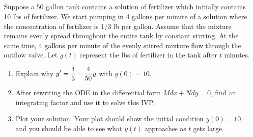 %


\subsection*{\ideaB}

\begin{problem}
Suppose a 50 gallon tank contains a solution of fertilizer which initially contains 10 lbs of fertilizer. We start pumping in 4 gallons per minute of a solution where the concentration of fertilizer is 1/3 lb per gallon. 
Assume that the mixture remains evenly spread throughout the entire tank by constant stirring. 
At the same time, 4 gallons per minute of the evenly stirred mixture flow through the outflow valve. 
Let $y(t)$ represent the lbs of fertilizer in the tank after $t$ minutes.
\begin{enumerate}
 \item Explain why $\displaystyle y' = \frac{4}{3}-\frac{4}{50}y$ with $y(0)=10$. 
 \item After rewriting the ODE in the differential form $Mdx+Ndy=0$, find an integrating factor and use it to solve this IVP.
 \item Plot your solution. Your plot should show the initial condition $y(0)=10$, and you should be able to see what $y(t)$ approaches as $t$ gets large.
\end{enumerate}
\end{problem}



